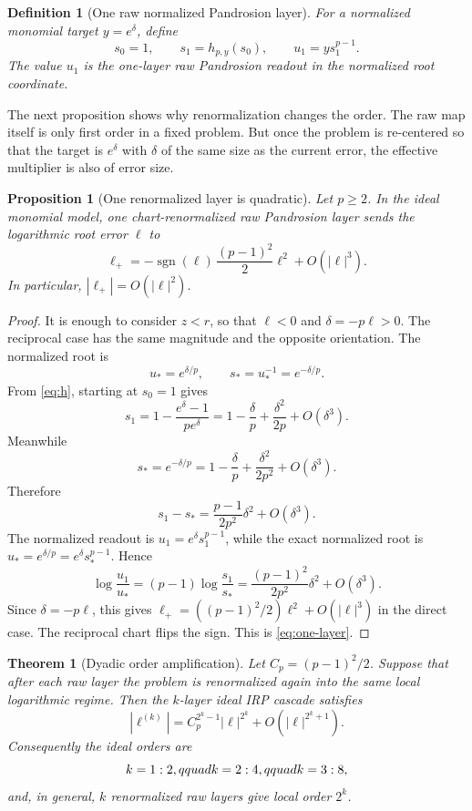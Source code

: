 \documentclass[11pt]{article}
\newtheorem{theorem}{Theorem}
\newtheorem{proposition}{Proposition}
\newtheorem{definition}{Definition}
\begin{document}
\begin{definition}[One raw normalized Pandrosion layer]
For a normalized monomial target $y=e^\delta$, define
\[
  s_0=1,\qquad s_1=h_{p,y}(s_0),\qquad u_1=y s_1^{p-1}.
\]
The value $u_1$ is the one-layer raw Pandrosion readout in the normalized root coordinate.
\end{definition}

The next proposition shows why renormalization changes the order.  The raw map itself is only first order in a fixed problem.  But once the problem is re-centered so that the target is $e^\delta$ with $\delta$ of the same size as the current error, the effective multiplier is also of error size.

\begin{proposition}[One renormalized layer is quadratic]
Let $p\geq 2$.  In the ideal monomial model, one chart-renormalized raw Pandrosion layer sends the logarithmic root error $\ell$ to
\begin{equation}
  \ell_+=-\operatorname{sgn}(\ell)\,\frac{(p-1)^2}{2}\ell^2+O(|\ell|^3). \label{eq:one-layer}
\end{equation}
In particular, $|\ell_+|=O(|\ell|^2)$.
\end{proposition}

\begin{proof}
It is enough to consider $z<r$, so that $\ell<0$ and $\delta=-p\ell>0$.  The reciprocal case has the same magnitude and the opposite orientation.  The normalized root is
\[
  u_*=e^{\delta/p},\qquad s_*=u_*^{-1}=e^{-\delta/p}.
\]
From \eqref{eq:h}, starting at $s_0=1$ gives
\[
  s_1=1-\frac{e^\delta-1}{p e^\delta}
      =1-\frac{\delta}{p}+\frac{\delta^2}{2p}+O(\delta^3).
\]
Meanwhile
\[
  s_*=e^{-\delta/p}=1-\frac{\delta}{p}+\frac{\delta^2}{2p^2}+O(\delta^3).
\]
Therefore
\[
  s_1-s_* = \frac{p-1}{2p^2}\delta^2+O(\delta^3).
\]
The normalized readout is $u_1=e^\delta s_1^{p-1}$, while the exact normalized root is $u_*=e^{\delta/p}=e^\delta s_*^{p-1}$.  Hence
\[
  \log\frac{u_1}{u_*}=(p-1)\log\frac{s_1}{s_*}
  =\frac{(p-1)^2}{2p^2}\delta^2+O(\delta^3).
\]
Since $\delta=-p\ell$, this gives $\ell_+=((p-1)^2/2)\ell^2+O(|\ell|^3)$ in the direct case.  The reciprocal chart flips the sign.  This is \eqref{eq:one-layer}.
\end{proof}

\begin{theorem}[Dyadic order amplification]
Let $C_p=(p-1)^2/2$.  Suppose that after each raw layer the problem is renormalized again into the same local logarithmic regime.  Then the $k$-layer ideal IRP cascade satisfies
\begin{equation}
  |\ell^{(k)}| = C_p^{2^k-1}|\ell|^{2^k}+O(|\ell|^{2^k+1}). \label{eq:dyadic}
\end{equation}
Consequently the ideal orders are
\[
  k=1:2,\\qquad k=2:4,\\qquad k=3:8,
\]
and, in general, $k$ renormalized raw layers give local order $2^k$.
\end{theorem}
\end{document}
